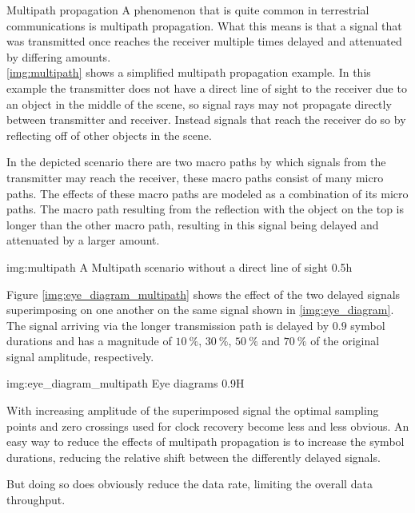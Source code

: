 \begin{subchapter}{Multipath propagation}
  A phenomenon that is quite common in terrestrial communications
  is multipath propagation.
  What this means is that a signal that was transmitted once reaches the
  receiver multiple times delayed and attenuated by differing amounts. \\

  \autoref{img:multipath} shows a simplified multipath propagation example.
  In this example the transmitter does not have a direct line of
  sight to the receiver due to an object in the middle of the scene,
  so signal rays may not propagate directly between transmitter and receiver.
  Instead signals that reach the receiver do
  so by reflecting off of other objects in the scene.

  In the depicted scenario there are two macro paths by which signals from
  the transmitter may reach the receiver, these macro paths consist of many
  micro paths.
  The effects of these macro paths are modeled as a combination of
  its micro paths.
  The macro path resulting from the reflection with the object on
  the top is longer than the other macro path, resulting in this signal being
  delayed and attenuated by a larger amount.

               {img:multipath}
               {A Multipath scenario without a direct line of sight}
               {0.5}{h}

  Figure \ref{img:eye_diagram_multipath} shows the effect of the
  two delayed signals superimposing on one another on the same signal
  shown in \autoref{img:eye_diagram}.
  The signal arriving via the longer transmission path
  is delayed by $0.9$ symbol durations and has a magnitude
  of $\SI{10}{\percent}$, $\SI{30}{\percent}$, $\SI{50}{\percent}$ and
  $\SI{70}{\percent}$ of the original signal amplitude, respectively.

               {img:eye_diagram_multipath}
               {Eye diagrams}
               {0.9}{H}

  With increasing amplitude of the superimposed signal the optimal
  sampling points and zero crossings used for clock recovery
  become less and less obvious.
  An easy way to reduce the effects of multipath propagation is to
  increase the symbol durations, reducing the relative shift between
  the differently delayed signals.

  But doing so does obviously reduce the data rate,
  limiting the overall data throughput.
\end{subchapter}

